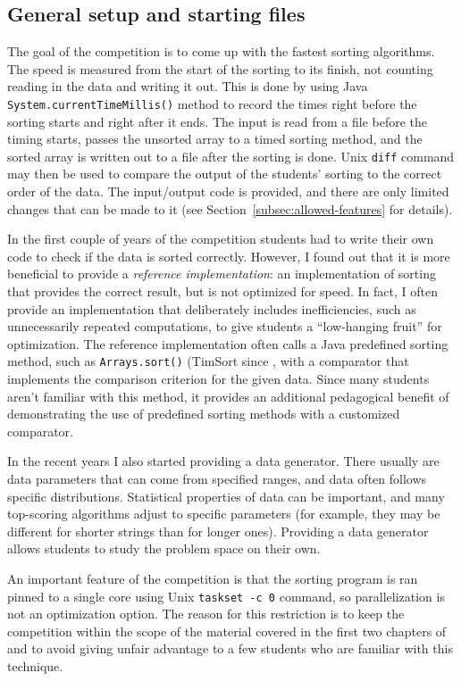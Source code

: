 \documentclass[12pt]{article}
\newcommand{\comment}[1]{}
\newcommand{\emcomment}[1]{\textcolor{ForestGreen}{\comment{Elena: {#1}}}}
\begin{document}
\subsection{General setup and starting files}\label{subsec:general}
The goal of the competition is to come up with the fastest sorting algorithms. The speed is measured from the start of the sorting to its finish, not counting reading in the data and writing it out. This is done by using Java \texttt{System.currentTimeMillis()} method to record the times right before the sorting starts and right after it ends. The input is read from a file before the timing starts, passes the unsorted array to a timed sorting method, and the sorted array is written out to a file after the sorting is done. 
Unix \texttt{diff} command may then be used to compare the output of the students' sorting to the correct order of the data. The input/output code is provided, and there are only limited changes that can be made to it (see Section~\ref{subsec:allowed-features} for details). 

In the first couple of years of the competition students had to write their own code to check if the data is sorted correctly. However, I found out that it is more beneficial to provide a \textit{reference implementation}: an implementation of sorting that provides the correct result, but is not optimized for speed. In fact, I often provide an implementation that deliberately includes inefficiencies, such as unnecessarily repeated computations, to give students a ``low-hanging fruit'' for optimization. The reference implementation often calls a Java predefined sorting method, such as \texttt{Arrays.sort()} (TimSort since \emcomment{fill in the year}, with a comparator that implements the comparison criterion for the given data. Since many students aren't familiar with this method, it provides an additional pedagogical benefit of demonstrating the use of predefined sorting methods with a customized comparator. 

In the recent years I also started providing a data generator. There usually are data parameters that can come from specified ranges, and data often follows specific distributions. Statistical properties of data can be important, and many top-scoring algorithms adjust to specific parameters (for example, they may be different for shorter strings than for longer ones). Providing a data generator allows students to study the problem space on their own. 

An important feature of the competition is that the sorting program is ran pinned to a single core using Unix \texttt{taskset -c 0} command, so parallelization is not an optimization option. The reason for this restriction is to keep the competition within the scope of the material covered in the first two chapters of~\cite{CLRS} and to avoid giving unfair advantage to a few students who are familiar with this technique. 
\end{document}
